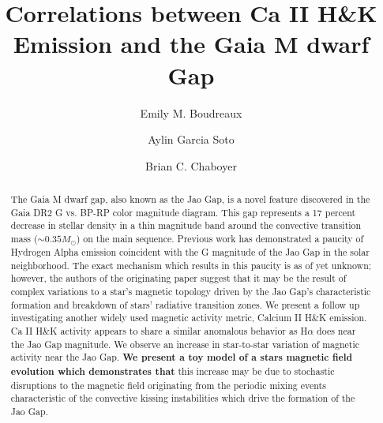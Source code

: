 \documentclass[twocolumn,linenumbers]{aastex62}
\begin{document}
\title{Correlations between Ca II H\&K Emission and the Gaia M dwarf Gap}


\author[0000-0002-2600-7513]{Emily M. Boudreaux}

\author[0000-0001-9828-3229]{Aylin Garcia Soto}

\author[0000-0003-3096-4161]{Brian C. Chaboyer}

\accepted{}


\begin{abstract}
  The Gaia M dwarf gap, also known as the Jao Gap, is a novel feature
  discovered in the Gaia DR2 G vs. BP-RP color magnitude diagram. This gap
  represents a 17 percent decrease in stellar density in a thin magnitude band
  around the convective transition mass ($\sim 0.35 M_{\odot}$) on the main
  sequence. Previous work has demonstrated a paucity of Hydrogen Alpha emission
  coincident with the G magnitude of the Jao Gap in the solar neighborhood. The
  exact mechanism which results in this paucity is as of yet unknown; however,
  the authors of the originating paper suggest that it may be the result of
  complex variations to a star's magnetic topology driven by the Jao Gap's
  characteristic formation and breakdown of stars' radiative transition zones.
  We present a follow up investigating another widely used magnetic activity
  metric, Calcium II H\&K emission. Ca II H\&K activity appears to share a
  similar anomalous behavior as H$\alpha$ does near the Jao Gap magnitude. We
  observe an increase in star-to-star variation of magnetic activity near the
  Jao Gap. \textbf{We present a toy model of a stars magnetic field evolution
  which demonstrates that} this increase may be due to stochastic disruptions
  to the magnetic field originating from the periodic mixing events
  characteristic of the convective kissing instabilities which drive the
  formation of the Jao Gap.
\end{abstract}

\end{document}
